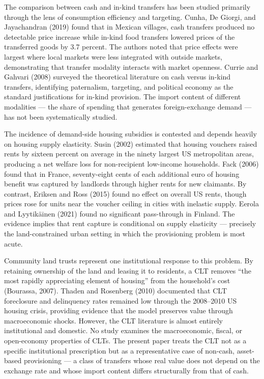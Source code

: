 \documentclass[preprint,review,12pt]{elsarticle}
\begin{document}
The comparison between cash and in-kind transfers has been studied
primarily through the lens of consumption efficiency and targeting.
Cunha, De Giorgi, and Jayachandran (2019) found that in Mexican
villages, cash transfers produced no detectable price increase while
in-kind food transfers lowered prices of the transferred goods by 3.7
percent. The authors noted that price effects were largest where local
markets were less integrated with outside markets, demonstrating that
transfer modality interacts with market openness. Currie and Gahvari
(2008) surveyed the theoretical literature on cash versus in-kind
transfers, identifying paternalism, targeting, and political economy as
the standard justifications for in-kind provision. The import content of
different modalities --- the share of spending that generates
foreign-exchange demand --- has not been systematically studied.

The incidence of demand-side housing subsidies is contested and depends
heavily on housing supply elasticity. Susin (2002) estimated that
housing vouchers raised rents by sixteen percent on average in the
ninety largest US metropolitan areas, producing a net welfare loss for
non-recipient low-income households. Fack (2006) found that in France,
seventy-eight cents of each additional euro of housing benefit was
captured by landlords through higher rents for new claimants. By
contrast, Eriksen and Ross (2015) found no effect on overall US rents,
though prices rose for units near the voucher ceiling in cities with
inelastic supply. Eerola and Lyytikäinen (2021) found no significant
pass-through in Finland. The evidence implies that rent capture is
conditional on supply elasticity --- precisely the land-constrained
urban setting in which the provisioning problem is most acute.

Community land trusts represent one institutional response to this
problem. By retaining ownership of the land and leasing it to residents,
a CLT removes ``the most rapidly appreciating element of housing'' from
the household's cost (Bourassa, 2007). Thaden and Rosenberg (2010)
documented that CLT foreclosure and delinquency rates remained low
through the 2008--2010 US housing crisis, providing evidence that the
model preserves value through macroeconomic shocks. However, the CLT
literature is almost entirely institutional and domestic. No study
examines the macroeconomic, fiscal, or open-economy properties of CLTs.
The present paper treats the CLT not as a specific institutional
prescription but as a representative case of non-cash, asset-based
provisioning --- a class of transfers whose real value does not depend
on the exchange rate and whose import content differs structurally from
that of cash.
\end{document}
